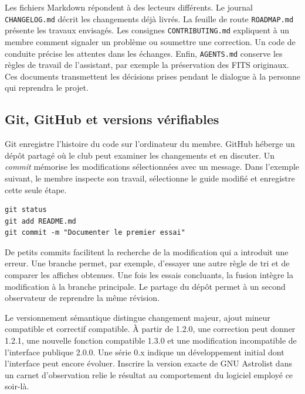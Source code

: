 Les fichiers Markdown répondent à des lecteurs différents. Le journal \texttt{CHANGELOG.md} décrit les changements déjà livrés. La feuille de route \texttt{ROADMAP.md} présente les travaux envisagés. Les consignes \texttt{CONTRIBUTING.md} expliquent à un membre comment signaler un problème ou soumettre une correction. Un code de conduite précise les attentes dans les échanges. Enfin, \texttt{AGENTS.md} conserve les règles de travail de l'assistant, par exemple la préservation des FITS originaux. Ces documents transmettent les décisions prises pendant le dialogue à la personne qui reprendra le projet.

\subsection{Git, GitHub et versions vérifiables}
Git enregistre l'histoire du code sur l'ordinateur du membre. GitHub héberge un dépôt partagé où le club peut examiner les changements et en discuter. Un \emph{commit} mémorise les modifications sélectionnées avec un message. Dans l'exemple suivant, le membre inspecte son travail, sélectionne le guide modifié et enregistre cette seule étape.
\begin{verbatim}
git status
git add README.md
git commit -m "Documenter le premier essai"
\end{verbatim}
De petits commits facilitent la recherche de la modification qui a introduit une erreur. Une branche permet, par exemple, d'essayer une autre règle de tri et de comparer les affiches obtenues. Une fois les essais concluants, la fusion intègre la modification à la branche principale. Le partage du dépôt permet à un second observateur de reprendre la même révision.

Le versionnement sémantique distingue changement majeur, ajout mineur compatible et correctif compatible. À partir de 1.2.0, une correction peut donner 1.2.1, une nouvelle fonction compatible 1.3.0 et une modification incompatible de l'interface publique 2.0.0. Une série 0.x indique un développement initial dont l'interface peut encore évoluer. Inscrire la version exacte de GNU Astrolist dans un carnet d'observation relie le résultat au comportement du logiciel employé ce soir-là.
\nocite{ref02,ref03,ref05,ref09,ref10,ref11,ref12,ref13,ref14,ref15,ref16,ref17}
